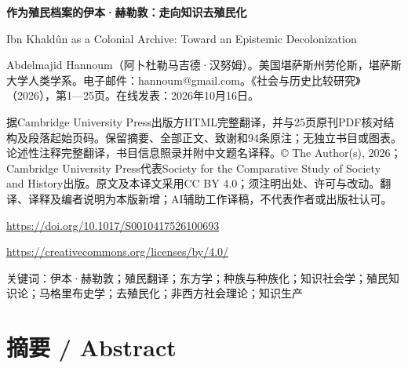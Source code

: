 \documentclass[10pt,a4paper]{article}
\begin{document}
{\Large\bfseries 作为殖民档案的伊本·赫勒敦：走向知识去殖民化\par}\medskip
Ibn Khaldûn as a Colonial Archive: Toward an Epistemic Decolonization\par
Abdelmajid Hannoum（阿卜杜勒马吉德·汉努姆）。美国堪萨斯州劳伦斯，堪萨斯大学人类学系。电子邮件：hannoum@gmail.com。《社会与历史比较研究》（2026），第1—25页。在线发表：2026年10月16日。\par
据Cambridge University Press出版方HTML完整翻译，并与25页原刊PDF核对结构及段落起始页码。保留摘要、全部正文、致谢和94条原注；无独立书目或图表。论述性注释完整翻译，书目信息照录并附中文题名译释。© The Author(s), 2026；Cambridge University Press代表Society for the Comparative Study of Society and History出版。原文及本译文采用CC BY 4.0；须注明出处、许可与改动。翻译、译释及编者说明为本版新增；AI辅助工作译稿，不代表作者或出版社认可。\par
\url{https://doi.org/10.1017/S0010417526100693}\par
\url{https://creativecommons.org/licenses/by/4.0/}\par
关键词：伊本·赫勒敦；殖民翻译；东方学；种族与种族化；知识社会学；殖民知识论；马格里布史学；去殖民化；非西方社会理论；知识生产\par\bigskip
{}\section*{摘要 / Abstract}
\end{document}
